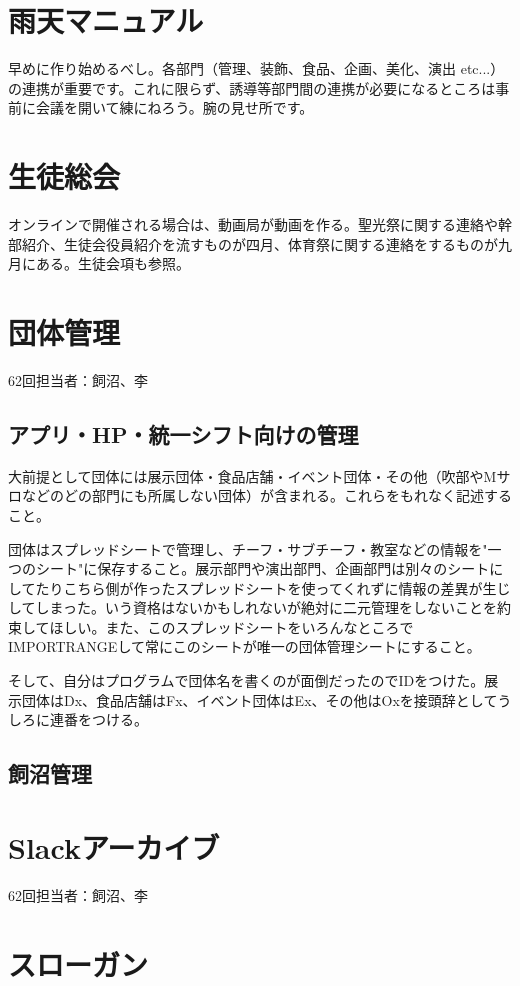 \documentclass[dvipdfmx,jb5]{jreport}
\begin{document}
\section{雨天マニュアル}
早めに作り始めるべし。各部門（管理、装飾、食品、企画、美化、演出 etc...）の連携が重要です。これに限らず、誘導等部門間の連携が必要になるところは事前に会議を開いて練にねろう。腕の見せ所です。

\section{生徒総会}
オンラインで開催される場合は、動画局が動画を作る。聖光祭に関する連絡や幹部紹介、生徒会役員紹介を流すものが四月、体育祭に関する連絡をするものが九月にある。生徒会項も参照。\\


\section{団体管理}
62回担当者：飼沼、李
\subsection{アプリ・HP・統一シフト向けの管理}
大前提として団体には展示団体・食品店舗・イベント団体・その他（吹部やMサロなどのどの部門にも所属しない団体）が含まれる。これらをもれなく記述すること。

団体はスプレッドシートで管理し、チーフ・サブチーフ・教室などの情報を"一つのシート"に保存すること。展示部門や演出部門、企画部門は別々のシートにしてたりこちら側が作ったスプレッドシートを使ってくれずに情報の差異が生じしてしまった。いう資格はないかもしれないが絶対に二元管理をしないことを約束してほしい。また、このスプレッドシートをいろんなところでIMPORTRANGEして常にこのシートが唯一の団体管理シートにすること。

そして、自分はプログラムで団体名を書くのが面倒だったのでIDをつけた。展示団体はDx、食品店舗はFx、イベント団体はEx、その他はOxを接頭辞としてうしろに連番をつける。
\subsection{飼沼管理}

\section{Slackアーカイブ}
62回担当者：飼沼、李


\section{スローガン}
\end{document}
